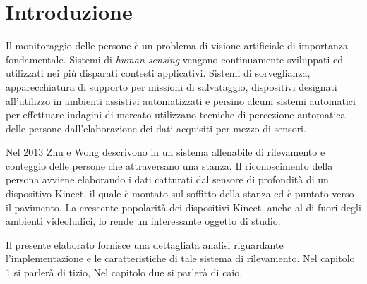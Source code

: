 
\chapter*{Introduzione}
\label{cap:Introduzione}
Il monitoraggio delle persone è un problema di visione artificiale di importanza fondamentale.
Sistemi di \emph{human sensing} vengono continuamente sviluppati ed utilizzati nei più disparati contesti applicativi. Sistemi di sorveglianza, apparecchiatura di supporto per missioni di salvataggio, dispositivi designati all'utilizzo in ambienti assistivi automatizzati e persino alcuni sistemi automatici per effettuare indagini di mercato utilizzano tecniche di percezione automatica delle persone dall'elaborazione dei dati acquisiti per mezzo di sensori.

Nel 2013 Zhu e Wong descrivono in \cite{Zhu13} un sistema allenabile di rilevamento e conteggio delle persone che attraversano una stanza.
Il riconoscimento della persona avviene elaborando i dati catturati dal sensore di profondità di un dispositivo Kinect, il quale è montato sul soffitto della stanza ed è puntato verso il pavimento. La crescente popolarità dei dispositivi Kinect, anche al di fuori degli ambienti videoludici, lo rende un interessante oggetto di studio.

Il presente elaborato fornisce una dettagliata analisi riguardante l'implementazione e le caratteristiche di tale sistema di rilevamento. 
Nel capitolo 1 si parlerà di tizio, Nel capitolo due si parlerà di caio.
